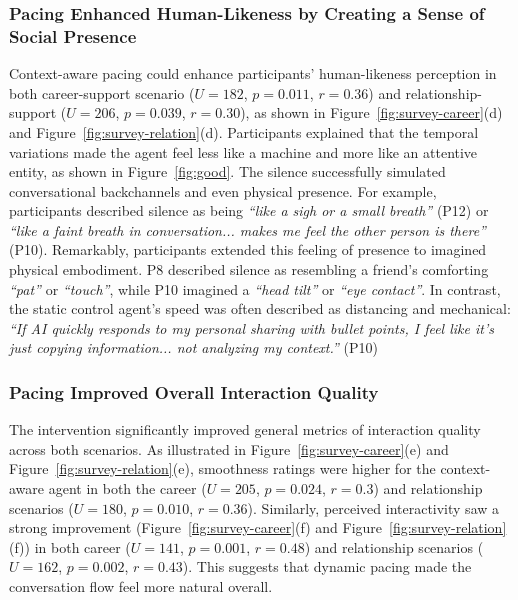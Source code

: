 \subsubsection{Pacing Enhanced Human-Likeness by Creating a Sense of Social Presence}
Context-aware pacing could enhance participants' human-likeness perception in both career-support scenario ($U=182$, $p = 0.011$, $r=0.36$) and relationship-support ($U=206$, $p = 0.039$, $r=0.30$), as shown in Figure~\ref{fig:survey-career}(d) and Figure~\ref{fig:survey-relation}(d). Participants explained that the temporal variations made the agent feel less like a machine and more like an attentive entity, as shown in Figure~\ref{fig:good}. The silence successfully simulated conversational backchannels and even physical presence. For example, participants described silence as being \textit{``like a sigh or a small breath''} (P12) or \textit{``like a faint breath in conversation... makes me feel the other person is there''} (P10).
Remarkably, participants extended this feeling of presence to imagined physical embodiment. P8 described silence as resembling a friend's comforting \textit{``pat''} or \textit{``touch''}, while P10 imagined a \textit{``head tilt''} or \textit{``eye contact''}. In contrast, the static control agent's speed was often described as distancing and mechanical: \textit{``If AI quickly responds to my personal sharing with bullet points, I feel like it's just copying information... not analyzing my context.''} (P10)

\subsubsection{Pacing Improved Overall Interaction Quality}
The intervention significantly improved general metrics of interaction quality across both scenarios. As illustrated in Figure~\ref{fig:survey-career}(e) and Figure~\ref{fig:survey-relation}(e), smoothness ratings were higher for the context-aware agent in both the career ($U=205$, $p = 0.024$, $r=0.3$) and relationship scenarios ($U=180$, $p = 0.010$, $r=0.36$). Similarly, perceived interactivity saw a strong improvement (Figure~\ref{fig:survey-career}(f) and Figure~\ref{fig:survey-relation}(f)) in both career ($U=141$, $p = 0.001$, $r=0.48$) and relationship scenarios ($U=162$, $p = 0.002$, $r=0.43$). This suggests that dynamic pacing made the conversation flow feel more natural overall.

